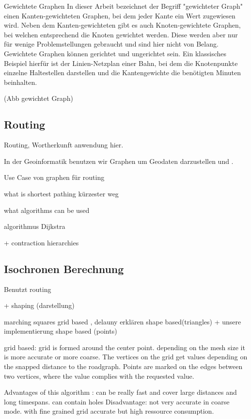 \documentclass[10pt,a4paper]{article}
\begin{document}
Gewichtete Graphen
In dieser Arbeit bezeichnet der Begriff "gewichteter Graph" einen Kanten-gewichteten Graphen, bei dem jeder Kante ein Wert 
zugewiesen wird. Neben dem Kanten-gewichteten gibt es auch Knoten-gewichtete Graphen, bei welchen entsprechend die Knoten gewichtet werden. Diese werden aber nur für wenige Problemstellungen gebraucht und sind hier nicht von Belang. Gewichtete Graphen können gerichtet und ungerichtet sein. Ein klassisches Beispiel hierfür ist der Linien-Netzplan einer Bahn, bei dem die Knotenpunkte einzelne Haltestellen darstellen und die Kantengewichte die benötigten Minuten beinhalten.

(Abb gewichtet Graph)



\subsection{Routing}

Routing, Wortherkunft anwendung hier.

In der Geoinformatik benutzen wir Graphen um Geodaten darzustellen und . 

Use Case von graphen für routing

what is shortest pathing
kürzester weg 

what algorithms can be used

algorithmus Dijkstra 

+ contraction hierarchies

\subsection{Isochronen Berechnung}

Benutzt routing

+ shaping (darstellung)

marching squares grid based , delauny erklären shape based(triangles) + unsere implementierung shape based (points)

grid based:
 grid is formed around the center point. depending on the mesh size it is more accurate or more coarse.
 The vertices on the grid get values depending on the snapped distance to the roadgraph.
 Points are marked on the edges between two vertices, where the value complies with the requested value.
 
Advantages of this algorithm : can be really fast and cover large distances and long timespans. can contain holes
Disadvantage: not very accurate in coarse mode. with fine grained grid accurate but high ressource consumption.
\end{document}
